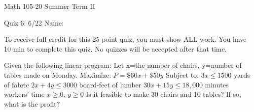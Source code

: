 \documentclass[11pt,epsfig]{article}
\begin{document}
Math 105-20 Summer Term II 

Quiz 6: 6/22 \hspace{1.9in} {Name:} {\underline {\hspace{3.5in}}}
\vspace{2pc}

To receive full credit for this 25 point quiz, you must show ALL work. You have 10 min to complete this quiz. No quizzes will be accepted after that time.
\vspace{2pc}

\begin{problem}{25}
Given the following linear program:
\newline
Let x=the number of chairs, y=number of tables made on Monday.
\newline
Maximize: $P=\$60x+\$50y$
\newline
Subject to:
\newline
$3x\leq 1500$ yards of fabric
\newline
$2x+4y\leq 3000$ board-feet of lumber
\newline
$30x+15y \leq 18,000$ minutes workers' time
\newline
$x \geq 0$, $y\geq 0$
\newline
Is it feasible to make 30 chairs and 10 tables? If so, what is the profit?



\vfill
\end{problem}



\showpoints
\end{document}
